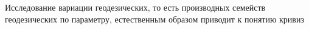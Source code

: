 
Исследование вариации геодезических, то есть производных семейств геодезических по параметру, естественным образом приводит к понятию кривиз




